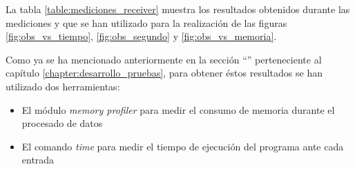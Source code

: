 La tabla \ref{table:mediciones_receiver} muestra los resultados obtenidos durante las mediciones y que se han utilizado para la realización de las figuras \ref{fig:obs_vs_tiempo}, \ref{fig:obs_segundo} y \ref{fig:obs_vs_memoria}.

Como ya se ha mencionado anteriormente en la sección ``'' perteneciente al capítulo \ref{chapter:desarrollo_pruebas}, para obtener éstos resultados se han utilizado dos herramientas:
\begin{itemize}
	\item
		El módulo \textit{memory profiler} para medir el consumo de memoria durante el procesado de datos
	\item
		El comando \textit{time} para medir el tiempo de ejecución del programa ante cada entrada
\end{itemize}

